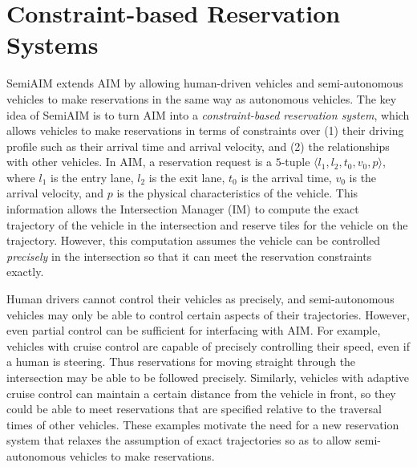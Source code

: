 \section{Constraint-based Reservation Systems}
\label{sec:constraint}

SemiAIM extends AIM by allowing human-driven vehicles and
semi-autonomous vehicles to make reservations in the same way as
autonomous vehicles.  The key idea of SemiAIM is to turn AIM into a
\emph{constraint-based reservation system}, which allows vehicles to
make reservations in terms of constraints over (1) their driving
profile such as their arrival time and arrival velocity, and (2) the
relationships with other vehicles.  In AIM, a reservation request is a
$5$-tuple $\langle l_1, l_2, t_0, v_0, p\rangle$, where $l_1$ is the
entry lane, $l_2$ is the exit lane, $t_0$ is the arrival time, $v_0$
is the arrival velocity, and $p$ is the physical characteristics of
the vehicle.  This information allows the Intersection Manager (IM) to
compute the exact trajectory of the vehicle in the intersection and
reserve tiles for the vehicle on the trajectory.  However, this
computation {assumes} the vehicle can be controlled \emph{precisely} in
the intersection so that it can meet the reservation constraints
exactly.

Human drivers cannot control their vehicles as precisely, and
semi-autonomous vehicles may only be able to control certain aspects
of their trajectories.  However, even partial control can be
sufficient for interfacing with AIM.  For example, vehicles with
cruise control are capable of precisely controlling their speed, even
if a human is steering.  Thus reservations for moving straight through
the intersection may be able to be followed precisely.  Similarly,
vehicles with adaptive cruise control can maintain a certain distance
from the vehicle in front, so they could be able to meet reservations
that are specified relative to the traversal times of other vehicles.
These examples motivate the need for a new reservation system that
relaxes the assumption of exact trajectories so as to allow
semi-autonomous vehicles to make reservations.

